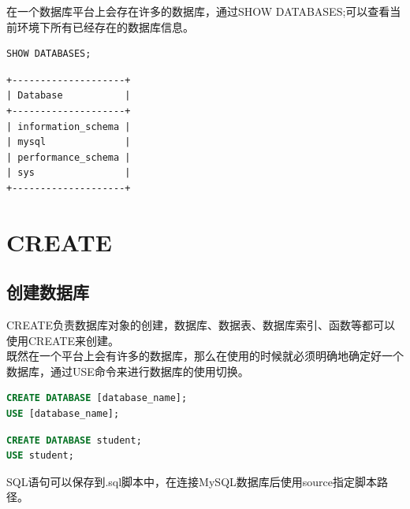 \documentclass[12pt, openany, oneside]{book}
\begin{document}
在一个数据库平台上会存在许多的数据库，通过SHOW DATABASES;可以查看当前环境下所有已经存在的数据库信息。\\


\begin{lstlisting}[language=SQL]
SHOW DATABASES;
\end{lstlisting}

\begin{tcolorbox}
	\begin{verbatim}
+--------------------+
| Database           |
+--------------------+
| information_schema |
| mysql              |
| performance_schema |
| sys                |
+--------------------+
	\end{verbatim}
\end{tcolorbox}

\newpage

\chapter{CREATE}

\section{创建数据库}

CREATE负责数据库对象的创建，数据库、数据表、数据库索引、函数等都可以使用CREATE来创建。\\

既然在一个平台上会有许多的数据库，那么在使用的时候就必须明确地确定好一个数据库，通过USE命令来进行数据库的使用切换。

\vspace{-0.5cm}

\begin{lstlisting}[language=SQL]
CREATE DATABASE [database_name];
USE [database_name];
\end{lstlisting}

\vspace{0.5cm}


\begin{lstlisting}[language=SQL]
CREATE DATABASE student;
USE student;
\end{lstlisting}

SQL语句可以保存到.sql脚本中，在连接MySQL数据库后使用source指定脚本路径。

\vspace{-0.5cm}
\end{document}
